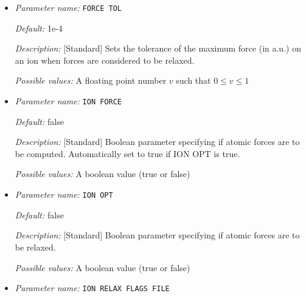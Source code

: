 \begin{itemize}
{\it Default:} false


{\it Description:} [Standard] Boolean parameter specifying if cell stress is to be computed. Automatically set to true if CELL OPT is true.


{\it Possible values:} A boolean value (true or false)
\item {\it Parameter name:} {\tt FORCE TOL}
\label{parameters:Geometry/Optimization/FORCE TOL}
\label{parameters:Geometry/Optimization/FORCE_20TOL}




{\it Default:} 1e-4


{\it Description:} [Standard] Sets the tolerance of the maximum force (in a.u.) on an ion when forces are considered to be relaxed.


{\it Possible values:} A floating point number $v$ such that $0 \leq v \leq 1$
\item {\it Parameter name:} {\tt ION FORCE}
\label{parameters:Geometry/Optimization/ION FORCE}
\label{parameters:Geometry/Optimization/ION_20FORCE}




{\it Default:} false


{\it Description:} [Standard] Boolean parameter specifying if atomic forces are to be computed. Automatically set to true if ION OPT is true.


{\it Possible values:} A boolean value (true or false)
\item {\it Parameter name:} {\tt ION OPT}
\label{parameters:Geometry/Optimization/ION OPT}
\label{parameters:Geometry/Optimization/ION_20OPT}




{\it Default:} false


{\it Description:} [Standard] Boolean parameter specifying if atomic forces are to be relaxed.


{\it Possible values:} A boolean value (true or false)
\item {\it Parameter name:} {\tt ION RELAX FLAGS FILE}
\label{parameters:Geometry/Optimization/ION RELAX FLAGS FILE}
\label{parameters:Geometry/Optimization/ION_20RELAX_20FLAGS_20FILE}





\end{itemize}
